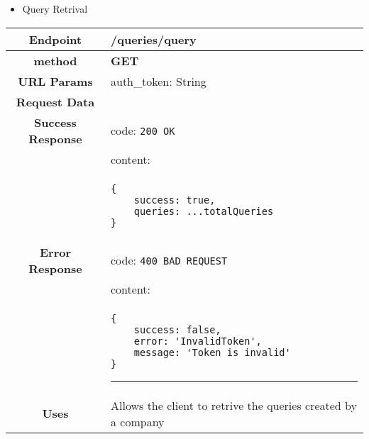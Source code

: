     \begin{itemize}
        \item Query Retrival
    \end{itemize}
    \begin{adjustwidth}{1cm}{}
        \begin{longtable}{|c|l|}
            \hline
            \textbf{Endpoint} & /queries/query \\
            \hline
            \textbf{method} & \textbf{GET} \\
            \hline
            \textbf{URL Params} &  auth\_token: String \\
            \hline
            \textbf{Request Data} & \\
            \hline
            \textbf{Success Response} & code: \texttt{200 OK} \\
            &                           content: \\
            & \begin{minipage}[t]{0.5\textwidth}
                \begin{adjustwidth}{1.5cm}{}
                \begin{verbatim}
{
    success: true, 
    queries: ...totalQueries
}
                \end{verbatim}
                \end{adjustwidth}
              \end{minipage} \\
              \hline
            \textbf{Error Response} & code: \texttt{400 BAD REQUEST} \\
              &                     content: \\
              & \begin{minipage}[t]{0.7\textwidth}
                \begin{adjustwidth}{1.5cm}{}
                \begin{verbatim}
{
    success: false, 
    error: 'InvalidToken',
    message: 'Token is invalid'
}
                \end{verbatim}
                \end{adjustwidth}
                \par\noindent\rule{\textwidth}{1pt}
                 \vspace{4pt}
              \end{minipage} \\
              \hline
            \textbf{Uses} & Allows the client to retrive the queries created by a company \\
            \hline
        \end{longtable}
    \end{adjustwidth} 
    
